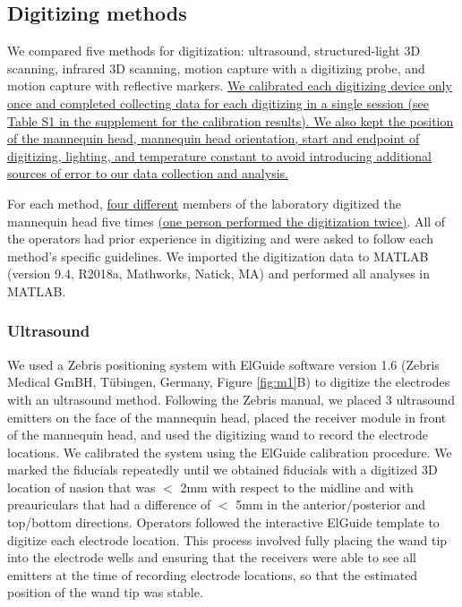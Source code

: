 \documentclass[../thesis_seyed.tex]{subfiles}
\begin{document}
\subsection{Digitizing methods}
We compared five methods for digitization: ultrasound, structured-light 3D scanning, infrared 3D scanning, motion capture with a digitizing probe, and motion capture with reflective markers. \ul{We calibrated each digitizing device only once and completed collecting data for each digitizing in a single session (see Table S1 in the supplement for the calibration results). We also kept the position of the mannequin head, mannequin head orientation, start and endpoint of digitizing, lighting, and temperature constant to avoid introducing additional sources of error to our data collection and analysis.}

For each method, \ul{four different} members of the laboratory digitized the mannequin head five times \ul{(one person performed the digitization twice)}. All of the operators had prior experience in digitizing and were asked to follow each method's specific guidelines. We imported the digitization data to MATLAB (version 9.4, R2018a, Mathworks, Natick, MA) and performed all analyses in MATLAB.

\subsubsection{Ultrasound}
We used a Zebris positioning system with ElGuide software version 1.6 (Zebris Medical GmBH, T\"ubingen, Germany, Figure \ref{fig:m1}B) to digitize the electrodes with an ultrasound method. Following the Zebris manual, we placed 3 ultrasound emitters on the face of the mannequin head, placed the receiver module in front of the mannequin head, and used the digitizing wand to record the electrode locations. We calibrated the system using the ElGuide calibration procedure. We marked the fiducials repeatedly until we obtained fiducials with a digitized 3D location of nasion that was $<$ 2mm with respect to the midline and with preauriculars that had a difference of $<$ 5mm in the anterior/posterior and top/bottom directions. Operators followed the interactive ElGuide template to digitize each electrode location. This process involved fully placing the wand tip into the electrode wells and ensuring that the receivers were able to see all emitters at the time of recording electrode locations, so that the estimated position of the wand tip was stable. 
\end{document}
